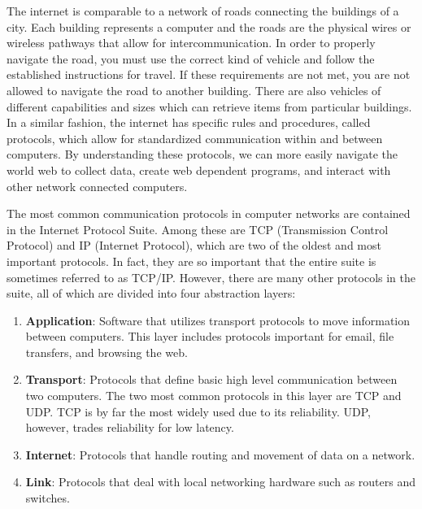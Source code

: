
The internet is comparable to a network of roads connecting the buildings of a city. Each building represents a computer and the roads are the physical wires or wireless pathways that allow for intercommunication. In order to properly navigate the road, you must use the correct kind of vehicle and follow the established instructions for travel. If these requirements are not met, you are not allowed to navigate the road to another building. There are also vehicles of different capabilities and sizes which can retrieve items from particular buildings. In a similar fashion, the internet has specific rules and procedures, called protocols, which allow for standardized communication within and between computers. By understanding these protocols, we can more easily navigate the world web to collect data, create web dependent programs, and interact with other network connected computers.

The most common communication protocols in computer networks are contained in the Internet Protocol Suite. Among these are TCP (Transmission Control Protocol) and IP (Internet Protocol), which are two of the oldest and most important protocols. In fact, they are so important that the entire suite is sometimes referred to as TCP/IP. However, there are many other protocols in the suite, all of which are divided into four abstraction layers:
\begin{enumerate}
\item \textbf{Application}: Software that utilizes transport protocols to move information between computers.
This layer includes protocols important for email, file transfers, and browsing the web.
\item \textbf{Transport}: Protocols that define basic high level communication between two computers.
The two most common protocols in this layer are TCP and UDP.
TCP is by far the most widely used due to its reliability.
UDP, however, trades reliability for low latency.
\item \textbf{Internet}: Protocols that handle routing and movement of data on a network.
\item \textbf{Link}: Protocols that deal with local networking hardware such as routers and switches.
\end{enumerate}

